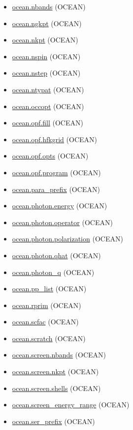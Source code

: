 \documentclass[11pt]{article}
\begin{document}
\begin{itemize}
\item \hyperref[kw:ocean-nbands]{ocean.nbands} (OCEAN)
\item \hyperref[kw:ocean-ngkpt]{ocean.ngkpt} (OCEAN)
\item \hyperref[kw:ocean-nkpt]{ocean.nkpt} (OCEAN)
\item \hyperref[kw:ocean-nspin]{ocean.nspin} (OCEAN)
\item \hyperref[kw:ocean-nstep]{ocean.nstep} (OCEAN)
\item \hyperref[kw:ocean-ntypat]{ocean.ntypat} (OCEAN)
\item \hyperref[kw:ocean-occopt]{ocean.occopt} (OCEAN)
\item \hyperref[kw:ocean-opf-fill]{ocean.opf.fill} (OCEAN)
\item \hyperref[kw:ocean-opf-hfkgrid]{ocean.opf.hfkgrid} (OCEAN)
\item \hyperref[kw:ocean-opf-opts]{ocean.opf.opts} (OCEAN)
\item \hyperref[kw:ocean-opf-program]{ocean.opf.program} (OCEAN)
\item \hyperref[kw:ocean-para-prefix]{ocean.para\_prefix} (OCEAN)
\item \hyperref[kw:ocean-photon-energy]{ocean.photon.energy} (OCEAN)
\item \hyperref[kw:ocean-photon-operator]{ocean.photon.operator} (OCEAN)
\item \hyperref[kw:ocean-photon-polarization]{ocean.photon.polarization} (OCEAN)
\item \hyperref[kw:ocean-photon-qhat]{ocean.photon.qhat} (OCEAN)
\item \hyperref[kw:ocean-photon-q]{ocean.photon\_q} (OCEAN)
\item \hyperref[kw:ocean-pp-list]{ocean.pp\_list} (OCEAN)
\item \hyperref[kw:ocean-rprim]{ocean.rprim} (OCEAN)
\item \hyperref[kw:ocean-scfac]{ocean.scfac} (OCEAN)
\item \hyperref[kw:ocean-scratch]{ocean.scratch} (OCEAN)
\item \hyperref[kw:ocean-screen-nbands]{ocean.screen.nbands} (OCEAN)
\item \hyperref[kw:ocean-screen-nkpt]{ocean.screen.nkpt} (OCEAN)
\item \hyperref[kw:ocean-screen-shells]{ocean.screen.shells} (OCEAN)
\item \hyperref[kw:ocean-screen-energy-range]{ocean.screen\_energy\_range} (OCEAN)
\item \hyperref[kw:ocean-ser-prefix]{ocean.ser\_prefix} (OCEAN)

\end{itemize}
\end{document}
